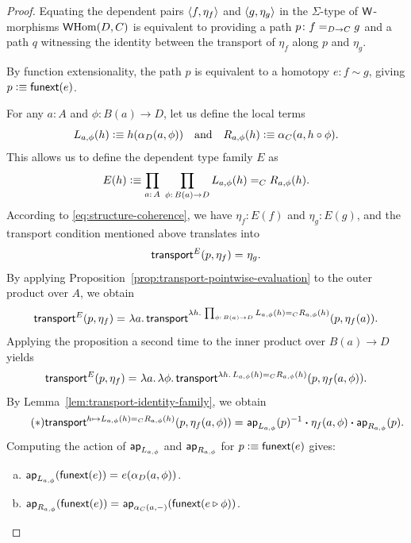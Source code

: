 \begin{proof}
    Equating the dependent pairs $\langle f,\eta_f\rangle$ and $\langle g,\eta_g\rangle$ in the $\Sigma$-type of $\mathsf{W}$-morphisms $\mathsf{W}{\operatorname{Hom}}(D,C)$ is equivalent to providing a path $p\colon f\eq{D\to C}g$ and a path $q$ witnessing the identity between the transport of $\eta_f$ along $p$ and $\eta_g$.
    
    By function extensionality, the path $p$ is equivalent to a homotopy $e\colon f\sim g$, giving $p\mathrel{\vcentcolon}\equiv\mathsf{funext}(e)$.
    
    For any $a\colon A$ and $\phi\colon B(a)\to D$, let us define the local terms
    \[
        L_{a,\phi}(h)\mathrel{\vcentcolon}\equiv h(\alpha_D(a,\phi))
            \quad\text{and}\quad
        R_{a,\phi}(h)\mathrel{\vcentcolon}\equiv\alpha_C(a,h\circ\phi).
    \]
    This allows us to define the dependent type family $E$ as
    \[
        E(h)\defeq
            \prod_{a\colon A}\;
            \prod_{\phi\colon B(a)\to D}
                L_{a,\phi}(h)\eq CR_{a,\phi}(h).
    \]
    According to \eqref{eq:structure-coherence}, we have $\eta_f\colon E(f)$ and $\eta_g\colon E(g)$, and the transport condition mentioned above translates into
    \[
        \mathsf{transport}^E(p,\eta_f)\mathrel{=_{}}\eta_g.
    \]
    By applying Proposition~\ref{prop:transport-pointwise-evaluation} to the outer product over $A$, we obtain
    \[
        \fun{transport}^E(p,\eta_f)
        \eq{}
        \lambda a.\,\fun{transport}^{
            \lambda h.\,\prod_{\phi\colon B(a)\to D}
                L_{a,\phi}(h)\eq CR_{a,\phi}(h)
            }
            (p,\eta_f(a)).
    \]
    Applying the proposition a second time to the inner product over $B(a)\to D$ yields
    \[
        \mathsf{transport}^E(p,\eta_f)\mathrel{=_{}}
        \lambda a.\,\lambda \phi.\, 
            \mathsf{transport}^{
                \lambda h.\,L_{a,\phi}(h)
                \mathrel{=_{C}}R_{a,\phi}(h)
            }
            (p,\eta_f(a,\phi)).
    \]
    By Lemma~\ref{lem:transport-identity-family}, we obtain
    \[\tag{$\ast$}
        \mathsf{transport}^{h \mapsto L_{a,\phi}(h) \mathrel{=_{C}} R_{a,\phi}(h)}(p, \eta_f(a,\phi)) 
        \mathrel{=_{}} \mathsf{ap}_{L_{a,\phi}}(p)^{-1} \mathbin{\boldsymbol{\cdot}} \eta_f(a,\phi) \mathbin{\boldsymbol{\cdot}} \mathsf{ap}_{R_{a,\phi}}(p).
    \]
    Computing the action of $\mathsf{ap}_{L_{a,\phi}}$ and $\mathsf{ap}_{R_{a,\phi}}$ for $p\mathrel{\vcentcolon}\equiv\mathsf{funext}(e)$ gives:
    \begin{enumerate}[a),font=\upshape]
        \item $\mathsf{ap}_{L_{a,\phi}}(\mathsf{funext}(e))\mathrel{=_{}} e(\alpha_D(a,\phi))$.
        \item $\mathsf{ap}_{R_{a,\phi}}(\mathsf{funext}(e))\mathrel{=_{}} \mathsf{ap}_{\alpha_C(a,{\mathord-})}(\mathsf{funext}(e\triangleright\phi))$.

\end{enumerate}
\end{proof}
